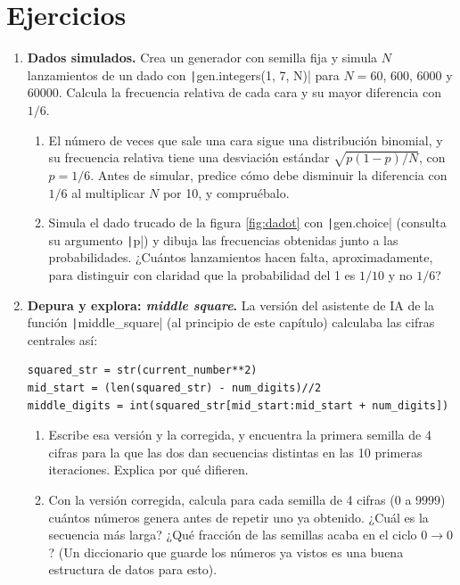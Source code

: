 \section{Ejercicios}
\begin{enumerate}
\item \label{ej:dado} \textbf{Dados simulados.} Crea un generador con semilla fija y simula $N$ lanzamientos de un dado con \texttt|gen.integers(1, 7, N)| para $N=60$, $600$, $6000$ y $60000$. Calcula la frecuencia relativa de cada cara y su mayor diferencia con $1/6$.
\begin{enumerate}
\item El número de veces que sale una cara sigue una distribución binomial, y su frecuencia relativa tiene una desviación estándar $\sqrt{p(1-p)/N}$, con $p=1/6$. Antes de simular, predice cómo debe disminuir la diferencia con $1/6$ al multiplicar $N$ por 10, y compruébalo.
\item Simula el dado trucado de la figura \ref{fig:dadot} con \texttt|gen.choice| (consulta su argumento \texttt|p|) y dibuja las frecuencias obtenidas junto a las probabilidades. ¿Cuántos lanzamientos hacen falta, aproximadamente, para distinguir con claridad que la probabilidad del 1 es $1/10$ y no $1/6$?
\end{enumerate}

\item \label{ej:middle_square} \textbf{Depura y explora: \emph{middle square}.} La versión del asistente de IA de la función \texttt|middle_square| (al principio de este capítulo) calculaba las cifras centrales así:
\begin{verbatim}
squared_str = str(current_number**2)
mid_start = (len(squared_str) - num_digits)//2
middle_digits = int(squared_str[mid_start:mid_start + num_digits])
\end{verbatim}
\begin{enumerate}
\item Escribe esa versión y la corregida, y encuentra la primera semilla de 4 cifras para la que las dos dan secuencias distintas en las 10 primeras iteraciones. Explica por qué difieren.
\item Con la versión corregida, calcula para cada semilla de 4 cifras ($0$ a $9999$) cuántos números genera antes de repetir uno ya obtenido. ¿Cuál es la secuencia más larga? ¿Qué fracción de las semillas acaba en el ciclo $0 \rightarrow 0$? (Un diccionario que guarde los números ya vistos es una buena estructura de datos para esto).
\end{enumerate}


\end{enumerate}
